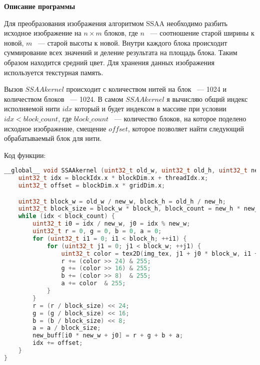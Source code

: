 \textbf{\large Описание программы}

Для преобразования изображения алгоритмом SSAA необходимо разбить исходное изображение на $n \times m$ блоков, где $n$ ~--- соотношение старой ширины к новой, $m$ ~--- старой высоты к новой. Внутри каждого блока происходит суммирование всех значений и деление результата на площадь блока. Таким образом находится средний цвет. Для хранения данных изображения используется текстурная память.

Вызов $SSAAkernel$ происходит с количеством нитей на блок ~--- 1024 и количеством блоков ~--- 1024.
В самом $SSAAkernel$ я вычисляю общий индекс исполняемой нити $idx$ который и будет индексом в массиве при условии $idx < block\_count$, где $block\_count$ ~--- количество блоков, на которое поделено исходное изображение, смещение $offset$, которое позволяет найти следующий обрабатываемый блок для нити.

Код функции:

\begin{lstlisting}[basicstyle=\normalfont, language=C++]
__global__ void SSAAkernel (uint32_t old_w, uint32_t old_h, uint32_t new_w, uint32_t new_h, uint32_t *new_buff) {
    uint32_t idx = blockIdx.x * blockDim.x + threadIdx.x;
    uint32_t offset = blockDim.x * gridDim.x;

    uint32_t block_w = old_w / new_w, block_h = old_h / new_h;
    uint32_t block_size = block_w * block_h, block_count = new_h * new_w;
    while (idx < block_count) {
        uint32_t i0 = idx / new_w, j0 = idx % new_w;
        uint32_t r = 0, g = 0, b = 0, a = 0;
        for (uint32_t i1 = 0; i1 < block_h; ++i1) {
            for (uint32_t j1 = 0; j1 < block_w; ++j1) {
                uint32_t color = tex2D(img_tex, j1 + j0 * block_w, i1 + i0 * block_h);
                r += (color >> 24) & 255;
                g += (color >> 16) & 255;
                b += (color >> 8)  & 255;
                a += color  & 255;
            }
        }
        r = (r / block_size) << 24;
        g = (g / block_size) << 16;
        b = (b / block_size) << 8;
        a = a / block_size;
        new_buff[i0 * new_w + j0] = r + g + b + a;
        idx += offset;
    }
}
\end{lstlisting}

\vspace{15pt}

